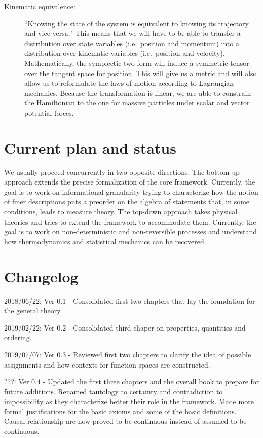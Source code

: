 \documentclass[11pt,letterpaper,fleqn]{memoir} %
\begin{document}
\begin{description}
	\item[Kinematic equivalence:] ``Knowing the state of the system is equivalent to knowing its trajectory and vice-versa." This means that we will have to be able to transfer a distribution over state variables (i.e.~position and momentum) into a distribution over kinematic variables (i.e.~position and velocity). Mathematically, the symplectic two-form will induce a symmetric tensor over the tangent space for position. This will give us a metric and will also allow us to reformulate the laws of motion according to Lagrangian mechanics. Because the transformation is linear, we are able to constrain the Hamiltonian to the one for massive particles under scalar and vector potential forces.
\end{description}

\section*{Current plan and status}

We usually proceed concurrently in two opposite directions. The bottom-up approach extends the precise formalization of the core framework. Currently, the goal is to work on informational granularity trying to characterize how the notion of finer descriptions puts a preorder on the algebra of statements that, in some conditions, leads to measure theory. The top-down approach takes physical theories and tries to extend the framework to accommodate them. Currently, the goal is to work on non-deterministic and non-reversible processes and understand how thermodynamics and statistical mechanics can be recovered.

\section*{Changelog}

\begin{description}
	\item 2018/06/22: Ver 0.1 - Consolidated first two chapters that lay the foundation for the general theory.
	\item 2019/02/22: Ver 0.2 - Consolidated third chaper on properties, quantities and ordering.
	\item 2019/07/07: Ver 0.3 - Reviewed first two chapters to clarify the idea of possible assignments and how contexts for function spaces are constructed.
	\item ???: Ver 0.4 - Updated the first three chapters and the overall book to prepare for future additions. Renamed tautology to certainty and contradiction to impossibility as they characterize better their role in the framework. Made more formal justifications for the basic axioms and some of the basic definitions. Causal relationship are now proved to be continuous instead of assumed to be continuous.
\end{description}
\end{document}
